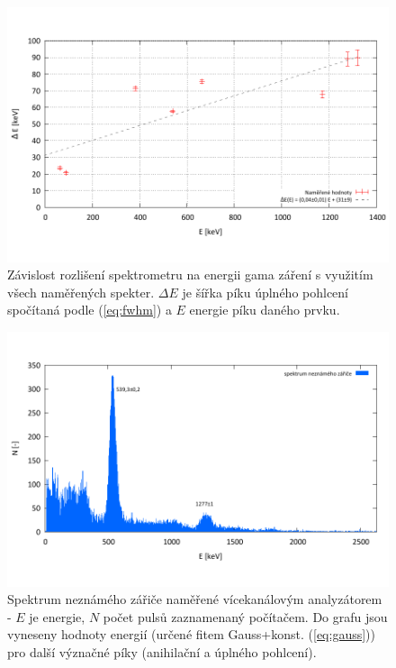 \documentclass[english]{article}
\begin{document}
	\begin{figure}[h!]
	\begin{center}
	    \vspace*{-1cm}
		\includegraphics[width=\linewidth]{../gnuplot/rozliseni.pdf}
	    \vspace*{-2cm}
		\caption{Závislost rozlišení spektrometru na energii gama záření s využitím všech naměřených spekter. $\Delta E$ je šířka píku úplného pohlcení spočítaná podle (\ref{eq:fwhm}) a $E$ energie píku daného prvku. }
		\label{fig:g_rozliseni}
	\end{center}
	\end{figure}						

	\begin{figure}[h!]
	\begin{center}
	    \vspace*{-1cm}
		\includegraphics[width=\linewidth]{../gnuplot/solo/Un.pdf}
	    \vspace*{-2cm}
		\caption{Spektrum neznámého zářiče naměřené vícekanálovým analyzátorem - $E$ je energie, $N$ počet pulsů zaznamenaný počítačem. Do grafu jsou vyneseny hodnoty energií (určené fitem Gauss+konst. (\ref{eq:gauss})) pro další význačné píky (anihilační a úplného pohlcení).}
		\label{fig:g_Un_vice}
	\end{center}
	\end{figure}
	
\end{document}
